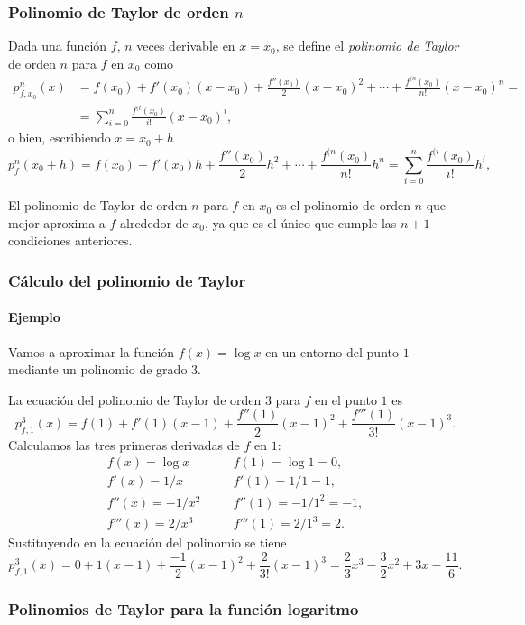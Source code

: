 \begin{frame}
	\frametitle{Polinomio de Taylor de orden $n$}
	\begin{definicion}
		Dada una función $f$, $n$ veces derivable en $x=x_0$, se define el \emph{polinomio de Taylor} de orden $n$ para $f$ en $x_0$ como
		\begin{align*}
			p_{f,x_0}^n(x) & =f(x_0)+f'(x_0)(x-x_0)+\frac{f''(x_0)}{2}(x-x_0)^2+\cdots +\frac{f^{(n}(x_0)}{n!}(x-x_0)^n = \\ &=\sum_{i=0}^{n}\frac{f^{(i}(x_0)}{i!}(x-x_0)^i,
		\end{align*}
		o bien, escribiendo $x=x_0+h$
		\[
			p_f^n(x_0+h)=f(x_0)+f'(x_0)h+\frac{f''(x_0)}{2}h^2+\cdots +\frac{f^{(n}(x_0)}{n!}h^n =\sum_{i=0}^{n}\frac{f^{(i}(x_0)}{i!}h^i,
		\]
	\end{definicion}
	
	El polinomio de Taylor de orden $n$ para $f$ en $x_0$ es el polinomio de orden $n$ que mejor aproxima a $f$ alrededor de $x_0$, ya que es el único que cumple las $n+1$ condiciones anteriores.
\end{frame}


\begin{frame}
	\frametitle{Cálculo del polinomio de Taylor}
	\framesubtitle{Ejemplo}
	Vamos a aproximar la función $f(x)=\log x$ en un entorno del punto $1$ mediante un polinomio de grado $3$.
	
	La ecuación del polinomio de Taylor de orden $3$ para $f$ en el punto $1$ es
	\[
		p_{f,1}^3(x)=f(1)+f'(1)(x-1)+\frac{f''(1)}{2}(x-1)^2+\frac{f'''(1)}{3!}(x-1)^3.
	\]
	Calculamos las tres primeras derivadas de $f$ en $1$:
	\[
		\begin{array}{lll}
			f(x)=\log x   & \quad & f(1)=\log 1 =0,   \\
			f'(x)=1/x     &       & f'(1)=1/1=1,      \\
			f''(x)=-1/x^2 &       & f''(1)=-1/1^2=-1, \\
			f'''(x)=2/x^3 &       & f'''(1)=2/1^3=2.  
		\end{array}
	\]
	Sustituyendo en la ecuación del polinomio se tiene
	\[
		p_{f,1}^3(x)=0+1(x-1)+\frac{-1}{2}(x-1)^2+\frac{2}{3!}(x-1)^3= \frac{2}{3}x^3-\frac{3}{2}x^2+3x-\frac{11}{6}.
	\]
\end{frame}


\begin{frame}
	\frametitle{Polinomios de Taylor para la función logaritmo}
	\begin{center}
		\scalebox{1}{}
	\end{center}
\end{frame}


